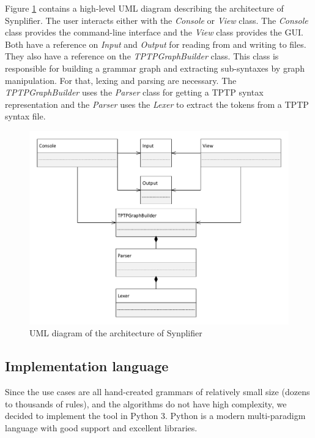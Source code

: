 Figure \ref{fig:ConceptArchitectureOverview} contains a high-level UML diagram describing the architecture of \ac{Synplifier}. The user interacts either with the \textit{Console} or \textit{View} class. The \textit{Console} class provides the command-line interface and the \textit{View} class provides the GUI. Both have a reference on \textit{Input} and \textit{Output} for reading from and writing to files. They also have a reference on the \textit{TPTPGraphBuilder} class. This class is responsible for building a grammar graph and extracting sub-syntaxes by graph manipulation. For that, lexing and parsing are necessary. The \textit{TPTPGraphBuilder} uses the \textit{Parser} class for getting a \ac{TPTP} syntax representation and the \textit{Parser} uses the \textit{Lexer} to extract the tokens from a \ac{TPTP} syntax file.
\begin{figure}[H]
\centering
\includegraphics[width=1\textwidth]{images/Concept_UML_Architecture_Overview.pdf}
\caption{UML diagram of the architecture of \ac{Synplifier}}
\label{fig:ConceptArchitectureOverview}
\end{figure}
\subsection{Implementation language}\label{sec:ConceptImplementationLanguage}

Since the use cases are all hand-created grammars of relatively small
size (dozens to thousands of rules), and the algorithms do not have
high complexity, we decided to implement the tool in Python 3. Python
is a modern multi-paradigm language with good support and excellent
libraries.


